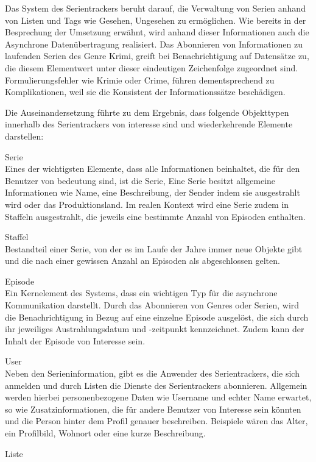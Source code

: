 \documentclass[a4paper]{article}
\begin{document}
Das System des Serientrackers beruht darauf, die Verwaltung von Serien anhand von Listen und Tags wie
Gesehen, Ungesehen zu ermöglichen. Wie bereits in der Besprechung der Umsetzung erwähnt, wird anhand
dieser Informationen auch die Asynchrone Datenübertragung realisiert.
Das Abonnieren von Informationen zu laufenden Serien des Genre Krimi, greift bei Benachrichtigung auf
Datensätze zu, die diesem Elementwert unter dieser eindeutigen Zeichenfolge zugeordnet sind. Formulierungsfehler
wie Krimie oder Crime, führen dementsprechend zu Komplikationen, weil sie die Konsistent der Informationssätze beschädigen.

Die Auseinandersetzung führte zu dem Ergebnis, dass folgende Objekttypen innerhalb des Serientrackers von interesse sind und wiederkehrende Elemente darstellen:

Serie \\
Eines der wichtigsten Elemente, dass alle Informationen beinhaltet, die für den Benutzer von bedeutung sind, ist die Serie, 
Eine Serie besitzt allgemeine Informationen wie Name, eine Beschreibung, der Sender indem sie ausgestrahlt wird oder das Produktionsland.
Im realen Kontext wird eine Serie zudem in Staffeln ausgestrahlt, die jeweils eine bestimmte Anzahl von Episoden enthalten.

Staffel \\
Bestandteil einer Serie, von der es im Laufe der Jahre immer neue Objekte gibt und die nach einer gewissen Anzahl an Episoden als abgeschlossen gelten.

Episode \\
Ein Kernelement des Systems, dass ein wichtigen Typ für die asynchrone Kommunikation darstellt. Durch das Abonnieren von Genres oder Serien, wird die Benachrichtigung in Bezug auf eine einzelne Episode ausgelöst, die sich durch ihr jeweiliges Austrahlungsdatum und -zeitpunkt kennzeichnet. 
Zudem kann der Inhalt der Episode von Interesse sein.

User \\
Neben den Serieninformation, gibt es die Anwender des Serientrackers, die sich anmelden und durch Listen die Dienste des Serientrackers abonnieren.
Allgemein werden hierbei personenbezogene Daten wie Username und echter Name erwartet, so wie Zusatzinformationen, die für andere Benutzer von Interesse sein könnten und die Person hinter dem Profil genauer beschreiben. Beispiele wären das Alter, ein Profilbild, Wohnort oder eine kurze Beschreibung.

Liste \\
\end{document}
